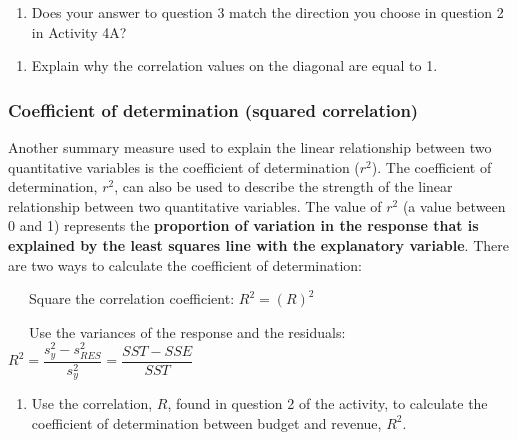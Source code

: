 \documentclass[
]{report}
\providecommand{\tightlist}{%
  \setlength{\itemsep}{0pt}\setlength{\parskip}{0pt}}
\begin{document}
\vspace{0.5in}

\begin{enumerate}
\def\labelenumi{\arabic{enumi}.}
\setcounter{enumi}{3}
\tightlist
\item
  Does your answer to question 3 match the direction you choose in question 2 in Activity 4A?
\end{enumerate}

\vspace{0.3in}

\begin{enumerate}
\def\labelenumi{\arabic{enumi}.}
\setcounter{enumi}{4}
\tightlist
\item
  Explain why the correlation values on the diagonal are equal to 1.
\end{enumerate}

\vspace{0.8in}
\newpage

\hypertarget{coefficient-of-determination-squared-correlation}{%
\subsubsection*{Coefficient of determination (squared correlation)}\label{coefficient-of-determination-squared-correlation}}

Another summary measure used to explain the linear relationship between two quantitative variables is the coefficient of determination (\(r^2\)). The coefficient of determination, \(r^2\), can also be used to describe the strength of the linear relationship between two quantitative variables. The value of \(r^2\) (a value between 0 and 1) represents the \textbf{proportion of variation in the response that is explained by the least squares line with the explanatory variable}. There are two ways to calculate the coefficient of determination:

~~~Square the correlation coefficient: \(R^2 = (R)^2\)

~~~Use the variances of the response and the residuals: \(R^2 = \dfrac{s_y^2 - s_{RES}^2}{s_y^2} = \dfrac{SST - SSE}{SST}\)

\begin{enumerate}
\def\labelenumi{\arabic{enumi}.}
\setcounter{enumi}{5}
\tightlist
\item
  Use the correlation, \(R\), found in question 2 of the activity, to calculate the coefficient of determination between budget and revenue, \(R^2\).
\end{enumerate}
\end{document}
